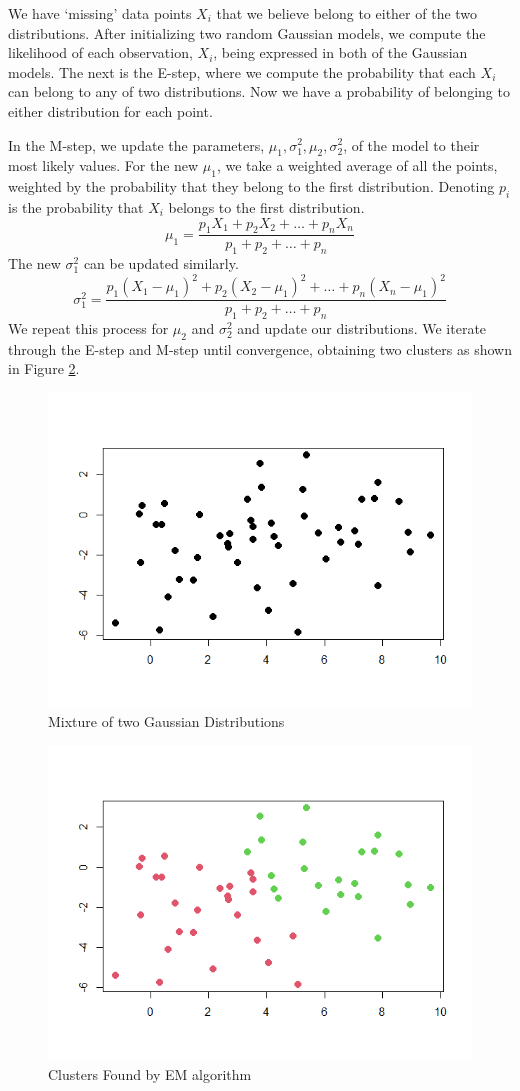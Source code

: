 \documentclass[11pt]{article}
\begin{document}
We have `missing' data points $X_i$ that we believe belong to either of the two distributions. After initializing two random Gaussian models, we compute the likelihood of each observation, $X_i$, being expressed in both of the Gaussian models. The next is the E-step, where we compute the probability that each $X_i$ can belong to any of two distributions. Now we have a probability of belonging to either distribution for each point. 

In the M-step, we update the parameters, $\mu_1,\sigma^2_1, \mu_2,\sigma^2_2$, of the model to their most likely values. For the new $\mu_1$, we take a weighted average of all the points, weighted by the probability that they belong to the first distribution. Denoting $p_i$ is the probability that $X_i$ belongs to the first distribution. 
\[\mu_1=\frac{p_1X_1+p_2X_2+\dots+p_nX_n}{p_1+p_2+\dots+p_n}\]
The new $\sigma^2_1$ can be updated similarly. 
\[\sigma^2_1=\frac{p_1(X_1-\mu_1)^2+p_2(X_2-\mu_1)^2+\dots+p_n(X_n-\mu_1)^2}{p_1+p_2+\dots+p_n}\]
We repeat this process for $\mu_2$ and $\sigma^2_2$ and update our distributions. We iterate through the E-step and M-step until convergence, obtaining two clusters as shown in Figure \ref{fig:clustering2}. 




\begin{figure}
    \centering
    \includegraphics[width = 10 cm]{nocolor.png}
    \caption{Mixture of two Gaussian Distributions}
    \label{fig:clustering1}
\end{figure}


\begin{figure}
    \centering
    \includegraphics[width = 10 cm]{clustering.png}
    \caption{Clusters Found by EM algorithm}
    \label{fig:clustering2}
\end{figure}
\end{document}
